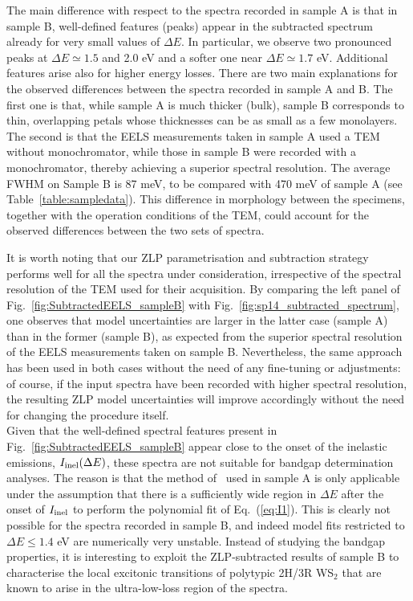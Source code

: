 The main difference with respect to the spectra recorded in sample A is that in sample B,
well-defined features (peaks) appear in the subtracted spectrum already for
very small values of $\Delta E$.
%
In particular, we observe two pronounced peaks at $\Delta E\simeq 1.5$ and 2.0 eV and a
softer one near $\Delta E \simeq 1.7$ eV.
%
Additional features arise also for higher energy losses.
%
There are two main explanations for the observed differences between the spectra recorded
in sample A and B.
%
The first one is that, while sample A is much thicker (bulk), sample B corresponds
to thin, overlapping petals whose thicknesses can be as small as a few monolayers.
%
The second is that the EELS measurements taken in sample A used a TEM without monochromator,
while those in sample B were recorded with a monochromator, thereby achieving a superior
spectral resolution.
%
The average FWHM on Sample B is 87 meV, to be compared with 470 meV of sample A (see
Table~\ref{table:sampledata}).
%
This difference in morphology between the specimens, together
with the operation conditions of the TEM, could account for 
the observed differences between the two sets of spectra.

It is worth noting that our ZLP parametrisation and subtraction strategy performs well
for all the spectra under consideration, irrespective of the spectral resolution of the TEM used
for their acquisition.
%
By comparing the left panel of Fig.~\ref{fig:SubtractedEELS_sampleB} with Fig.~\ref{fig:sp14_subtracted_spectrum}, 
one observes that  model uncertainties are larger in the latter case (sample A) 
than in the former (sample B), as expected from the
superior spectral resolution of the EELS measurements taken on sample B.
%
Nevertheless, the same approach has been used in both cases without the need of any fine-tuning
or adjustments: of course, if the input
spectra have been recorded with higher spectral resolution, the resulting ZLP model uncertainties
will improve accordingly without the need for changing the procedure itself.\\

Given that the
well-defined spectral features present in Fig.~\ref{fig:SubtractedEELS_sampleB}
appear close to the onset of the inelastic emissions, $I_{\rm inel}(\Delta E)$,
these spectra are not suitable for bandgap determination analyses.
%
The reason is that the method of~\cite{Rafferty:2000}
used in sample A is only applicable under the assumption that there is a sufficiently wide region in $\Delta E$
after the onset of $I_{\rm inel}$ to perform the polynomial fit of Eq.~(\ref{eq:I1}).
%
This is clearly not possible  for the spectra recorded in sample B, and indeed model fits restricted to $\Delta E\le 1.4$ eV
are numerically very unstable.
%
Instead of studying the bandgap properties, it is interesting to exploit the ZLP-subtracted results of sample B
to characterise the local
excitonic transitions of polytypic 2H/3R WS$_2$
that are known to arise in the ultra-low-loss region of the spectra.

